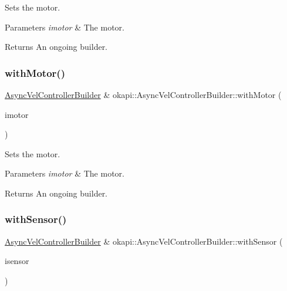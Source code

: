Sets the motor.


\begin{DoxyParams}{Parameters}
{\em imotor} & The motor. \\
\hline
\end{DoxyParams}
\begin{DoxyReturn}{Returns}
An ongoing builder. 
\end{DoxyReturn}
\mbox{\label{classokapi_1_1AsyncVelControllerBuilder_aadd1a0eb89fb1c5dad47b1700f953ff1}} 
\subsubsection{\texorpdfstring{withMotor()}{withMotor()}\hspace{0.1cm}{\footnotesize\ttfamily [3/3]}}
{\footnotesize\ttfamily \mbox{\hyperlink{classokapi_1_1AsyncVelControllerBuilder}{Async\+Vel\+Controller\+Builder}} \& okapi\+::\+Async\+Vel\+Controller\+Builder\+::with\+Motor (\begin{DoxyParamCaption}\item[{const std\+::shared\+\_\+ptr$<$ \mbox{\hyperlink{classokapi_1_1AbstractMotor}{Abstract\+Motor}} $>$ \&}]{imotor }\end{DoxyParamCaption})}

Sets the motor.


\begin{DoxyParams}{Parameters}
{\em imotor} & The motor. \\
\hline
\end{DoxyParams}
\begin{DoxyReturn}{Returns}
An ongoing builder. 
\end{DoxyReturn}
\mbox{\label{classokapi_1_1AsyncVelControllerBuilder_a611d50478ee813ce9b0c5b5ed113d6db}} 
\subsubsection{\texorpdfstring{withSensor()}{withSensor()}\hspace{0.1cm}{\footnotesize\ttfamily [1/3]}}
{\footnotesize\ttfamily \mbox{\hyperlink{classokapi_1_1AsyncVelControllerBuilder}{Async\+Vel\+Controller\+Builder}} \& okapi\+::\+Async\+Vel\+Controller\+Builder\+::with\+Sensor (\begin{DoxyParamCaption}\item[{const \mbox{\hyperlink{classokapi_1_1ADIEncoder}{A\+D\+I\+Encoder}} \&}]{isensor }\end{DoxyParamCaption})}

